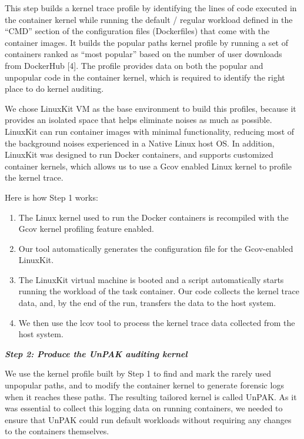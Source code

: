 This step builds a kernel trace profile by identifying the lines of code executed  in the  container kernel while running the default / regular workload defined in the “CMD” section of the configuration files (Dockerfiles) that come with the container images. It builds the popular paths kernel profile by running a set of containers ranked as “most popular” based on the number of user downloads from DockerHub [4]. The profile provides data on both the popular and unpopular code in the container kernel, which is required to identify the right place to do kernel auditing. 

We chose LinuxKit \cite{LinuxKit} VM as the base environment to build this profiles, because it provides an isolated space that helps eliminate noises as much as possible. 
LinuxKit  can run container images with minimal functionality, reducing most of the background noises experienced in a Native Linux host OS. 
In addition, LinuxKit was designed to run Docker containers, and supports customized container kernels, which allows us to use a Gcov \cite{gcov} enabled Linux kernel to profile the kernel trace.

Here is how Step 1 works:
\begin{enumerate}
	\item The Linux kernel used to run the Docker containers is recompiled with the Gcov \cite{gcov} kernel profiling feature enabled. 
	\item Our tool automatically generates the configuration file for the Gcov-enabled LinuxKit. 
	\item The LinuxKit virtual machine is booted and a script automatically starts running the workload of the task container. Our code collects the kernel trace data, and, by the end of the run, transfers the data to the host system. 
	\item We then use the lcov \cite{lcov} tool to process the kernel trace data collected from the host system. 
\end{enumerate}

\noindent
\textit{\textbf{Step 2: Produce the UnPAK auditing kernel}}

We use the kernel profile built by Step 1 to find and mark the rarely used unpopular paths, and to modify the container kernel to generate forensic logs when it reaches these paths. The resulting tailored kernel is called UnPAK. As it was essential to collect this logging data on running containers, we needed to ensure that UnPAK could  run default workloads without requiring any changes to the containers themselves. 

